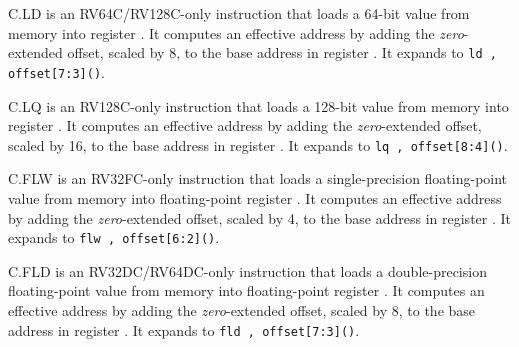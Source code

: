 C.LD is an RV64C/RV128C-only instruction that loads a 64-bit value from memory into
register {\em \rdprime}.  It computes an effective address by adding the {\em
zero}-extended offset, scaled by 8, to the base address in register {\em
\rsoneprime}.
It expands to {\tt ld \rdprime, offset[7:3](\rsoneprime)}.

C.LQ is an RV128C-only instruction that loads a 128-bit value from memory into
register {\em \rdprime}.  It computes an effective address by adding the {\em
zero}-extended offset, scaled by 16, to the base address in register {\em
\rsoneprime}.
It expands to {\tt lq \rdprime, offset[8:4](\rsoneprime)}.

C.FLW is an RV32FC-only instruction that loads a single-precision
floating-point value from memory into floating-point register {\em \rdprime}.  It
computes an effective address by adding the {\em zero}-extended offset, scaled
by 4, to the base address in register {\em \rsoneprime}.  It expands to {\tt flw
\rdprime, offset[6:2](\rsoneprime)}.

C.FLD is an RV32DC/RV64DC-only instruction that loads a double-precision
floating-point value from memory into floating-point register {\em \rdprime}.  It
computes an effective address by adding the {\em zero}-extended offset, scaled
by 8, to the base address in register {\em \rsoneprime}.  It expands to {\tt fld
\rdprime, offset[7:3](\rsoneprime)}.

